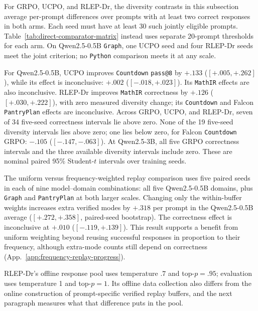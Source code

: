 For GRPO, UCPO, and RLEP-Dr, the diversity contrasts in this subsection
average per-prompt differences over prompts with at least two correct
responses in both arms. Each seed must have at least 30 such jointly
eligible prompts. Table~\ref{tab:direct-comparator-matrix} instead uses
separate 20-prompt thresholds for each arm. On Qwen2.5-0.5B \texttt{Graph},
one UCPO seed and four RLEP-Dr seeds meet the joint criterion; no
\texttt{Python} comparison meets it at any scale.

For Qwen2.5-0.5B, UCPO improves \texttt{Countdown} \texttt{pass@8} by
$+.133$ ($[+.005,+.262]$), while its \pmd{} effect is inconclusive:
$+.002$ ($[-.018,+.023]$). Its \texttt{MathIR} effects are also
inconclusive. RLEP-Dr improves \texttt{MathIR} correctness by $+.126$
($[+.030,+.222]$), with zero measured diversity change; its
\texttt{Countdown} and Falcon \texttt{PantryPlan} effects are inconclusive.
Across GRPO, UCPO, and RLEP-Dr, seven of 34 five-seed correctness intervals
lie above zero. None of the 19 five-seed diversity intervals lies above zero; one lies
below zero, for Falcon \texttt{Countdown} GRPO: $-.105$
($[-.147,-.063]$). At Qwen2.5-3B, all five GRPO correctness intervals and
the three available diversity intervals include zero. These are nominal
paired 95\% Student-$t$ intervals over training seeds.

The uniform versus frequency-weighted replay comparison uses five paired
seeds in each of nine model--domain combinations: all five Qwen2.5-0.5B
domains, plus \texttt{Graph} and \texttt{PantryPlan} at both larger scales.
Changing only the within-buffer weights increases extra verified modes by
$+.318$ per prompt in the Qwen2.5-0.5B average ($[+.272,+.358]$,
paired-seed bootstrap). The correctness effect is inconclusive at $+.010$
($[-.119,+.139]$). This result supports a benefit from uniform weighting
beyond reusing successful responses in proportion to their frequency,
although extra-mode counts still depend on correctness
(App.~\ref{app:frequency-replay-progress}).

RLEP-Dr's offline response pool uses temperature $.7$ and top-$p=.95$;
evaluation uses temperature 1 and top-$p=1$. Its offline data collection
also differs from the online construction of prompt-specific verified replay
buffers, and the next paragraph measures what that difference puts in the pool.


